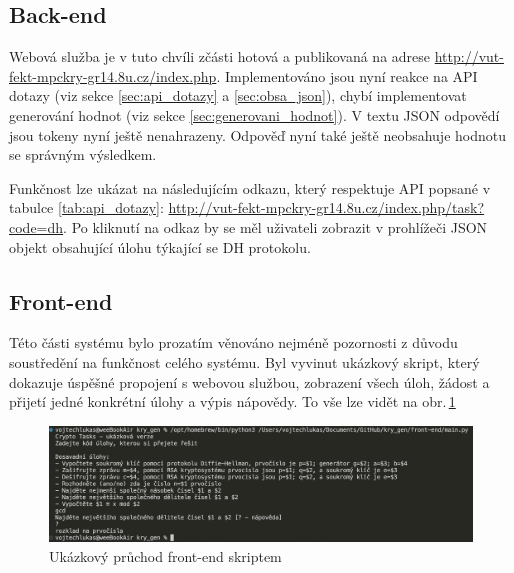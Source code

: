 \documentclass[titlepage]{article}
\begin{document}
\subsection{Back-end}
Webová služba je v tuto chvíli zčásti hotová a publikovaná na adrese \url{http://vut-fekt-mpckry-gr14.8u.cz/index.php}. Implementováno jsou nyní reakce na API dotazy (viz sekce \ref{sec:api_dotazy} a \ref{sec:obsa_json}), chybí implementovat generování hodnot (viz sekce \ref{sec:generovani_hodnot}). V textu JSON odpovědí jsou tokeny  nyní ještě nenahrazeny. Odpověď nyní také ještě neobsahuje hodnotu se správným výsledkem. 



Funkčnost lze ukázat na následujícím odkazu, který respektuje API popsané v tabulce \ref{tab:api_dotazy}:
\url{http://vut-fekt-mpckry-gr14.8u.cz/index.php/task?code=dh}.
Po kliknutí na odkaz by se měl uživateli zobrazit v prohlížeči JSON objekt obsahující úlohu týkající se DH protokolu. 

\subsection{Front-end}
Této části systému bylo prozatím věnováno nejméně pozornosti z důvodu sou\-středění na funkčnost celého systému. Byl vyvinut ukázkový skript, který dokazuje úspěšné propojení s webovou službou, zobrazení všech úloh, žádost a přijetí jedné konkrétní úlohy a výpis nápovědy. To vše lze vidět na obr.\,\ref{fig:front_end}

\begin{figure}
    \centering
    \includegraphics[width=.8\linewidth]{frontend.png}
    \caption{Ukázkový průchod front-end skriptem}
    \label{fig:front_end}
\end{figure}
\end{document}
